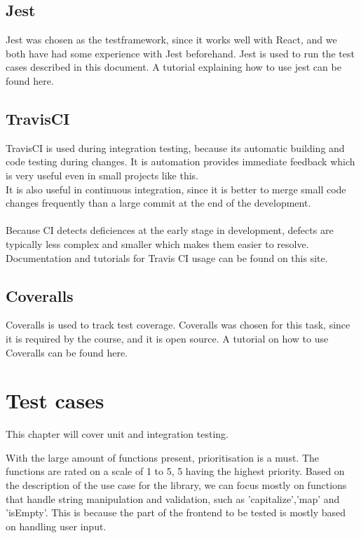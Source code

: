 \documentclass[a4paper, 12pt]{article}
\begin{document}
    \subsection{Jest}

    Jest\cite{Jest} was chosen as the testframework, since it works well with React, and we both have had some experience with Jest beforehand.
    Jest is used to run the test cases described in this document. A tutorial explaining how to use jest can be found here.\cite{JestTutorial}

    \subsection{TravisCI}
    
    TravisCI\cite{Travis} is used during integration testing, because its automatic building and code testing during changes. It is automation provides immediate feedback which 
    is very useful even in small projects like this.
    \\
     It is also useful in continuous integration, since it is better to merge small code changes frequently than a large commit at 
    the end of the development.
    \\
    \\
     Because CI detects deficiences at the early stage in development, defects are typically less complex and smaller which makes them easier to resolve.
    Documentation and tutorials for Travis CI usage can be found on this site. \cite{TravisTutorial}

    \subsection{Coveralls}

    Coveralls\cite{coveralls} is used to track test coverage. Coveralls was chosen for this task, since it is required by the course, and it is open source. 
    A tutorial on how to use Coveralls can be found here\cite{coverallsTutorial}.

\section{Test cases}
This chapter will cover unit and integration testing.

With the large amount of functions present, prioritisation is a must. The functions are rated on a scale of 1 to 5, 5 having the highest priority.
Based on the description of the use case for the library, we can focus mostly on functions that handle string manipulation and validation,
such as 'capitalize','map' and 'isEmpty'. This is because the part of the frontend to be tested  is mostly based on handling user input.
\\\\
\end{document}

